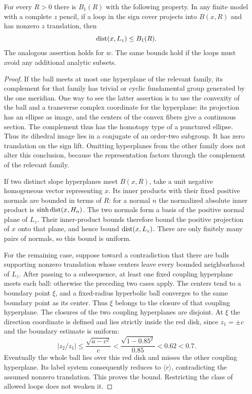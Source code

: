 \begin{lemma}\label{mod:buffer-bound}
For every $R>0$ there is $B_1(R)$ with the following property.
In any finite model with a complete $z$ pencil, if a loop in the
sign cover projects into $B(x,R)$ and has nonzero $z$ translation,
then
\[
 \operatorname{dist}(x,L_z)\le B_1(R).
\]
The analogous assertion holds for $w$.  The same bounds hold if
the loops must avoid any additional analytic subsets.
\end{lemma}
\begin{proof}
If the ball meets at most one hyperplane of the relevant family,
its complement for that family has trivial or cyclic fundamental
group generated by the one meridian.  One way to see the latter
assertion is to use the convexity of the ball and a transverse
complex coordinate for the hyperplane: its projection has an
ellipse as image, and the centers of the convex fibers give a
continuous section.  The complement thus has the homotopy type
of a punctured ellipse.  Thus its dihedral image lies in a
conjugate of an order-two subgroup.  It has zero translation on
the sign lift.  Omitting hyperplanes from the other family does
not alter this conclusion, because the representation factors
through the complement of the relevant family.

If two distinct slope hyperplanes meet $B(x,R)$, take a unit
negative homogeneous vector representing $x$.  Its inner products
with their fixed positive normals are bounded in terms of $R$:
for a normal $n$ the normalized absolute inner product is
$\sinh\operatorname{dist}(x,H_n)$.  The two normals form a basis of the positive
normal plane of $L_z$.  Their inner-product bounds therefore bound
the positive projection of $x$ onto that plane, and hence bound
$\operatorname{dist}(x,L_z)$.  There are only finitely many pairs of normals,
so this bound is uniform.

For the remaining case, suppose toward a contradiction that there
are balls supporting nonzero translation whose centers leave every
bounded neighborhood of $L_z$.  After passing to a subsequence,
at least one fixed coupling hyperplane meets each ball: otherwise
the preceding two cases apply.  The centers tend to a boundary
point $\xi$, and a fixed-radius hyperbolic ball converges to the
same boundary point as its center.  Thus $\xi$ belongs to the
closure of that coupling hyperplane.  The closures of the two
coupling hyperplanes are disjoint.  At $\xi$ the direction coordinate
is defined and lies strictly inside the red disk, since $z_1=\pm c$
and the boundary estimate is uniform:
\[
 |z_2/z_1|\le\frac{\sqrt{a-c^2}}{c}
 <\frac{\sqrt{1-0.85^2}}{0.85}<0.62<0.7.
\]
Eventually the whole ball lies over this red disk and misses the
other coupling hyperplane.  Its label system consequently reduces
to $\langle r\rangle$, contradicting the assumed nonzero
translation.  This proves the bound.  Restricting the class of
allowed loops does not weaken it.
\end{proof}

